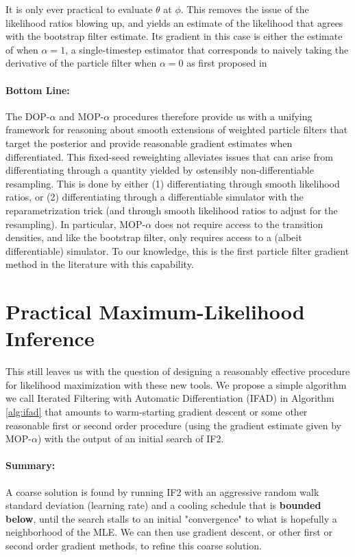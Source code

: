 \documentclass{article}
\begin{document}
It is only ever practical to evaluate $\theta$ at $\phi$. This removes the issue of the likelihood ratios blowing up, and yields an estimate of the likelihood that agrees with the bootstrap filter estimate. Its gradient in this case is either the estimate of \citet{doucet2011sf} when $\alpha=1$, a single-timestep estimator that corresponds to naively taking the derivative of the particle filter when $\alpha=0$ as first proposed in \citet{blei2018vsmc}

\paragraph{Bottom Line:} The DOP-$\alpha$ and MOP-$\alpha$ procedures therefore provide us with a unifying framework for reasoning about smooth extensions of weighted particle filters that target the posterior and provide reasonable gradient estimates when differentiated. This fixed-seed reweighting alleviates issues that can arise from differentiating through a quantity yielded by ostensibly non-differentiable resampling. This is done by either (1) differentiating through smooth likelihood ratios, or (2) differentiating through a differentiable simulator with the reparametrization trick (and through smooth likelihood ratios to adjust for the resampling). In particular, MOP-$\alpha$ does not require access to the transition densities, and like the bootstrap filter, only requires access to a (albeit differentiable) simulator. To our knowledge, this is the first particle filter gradient method in the literature with this capability. 


\section{Practical Maximum-Likelihood Inference}


This still leaves us with the question of designing a reasonably effective procedure for likelihood maximization with these new tools. We propose a simple algorithm we call Iterated Filtering with Automatic Differentiation (IFAD) in Algorithm \ref{alg:ifad} that amounts to warm-starting gradient descent or some other reasonable first or second order procedure (using the gradient estimate given by MOP-$\alpha$) with the output of an initial search of IF2. 

\paragraph{Summary:} A coarse solution is found by running IF2 with an aggressive random walk standard deviation (learning rate) and a cooling schedule that is \textbf{bounded below}, until the search stalls to an initial "convergence" to what is hopefully a neighborhood of the MLE. We can then use gradient descent, or other first or second order gradient methods, to refine this coarse solution.
\end{document}
